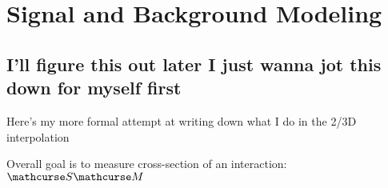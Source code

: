 \chapter{Signal and Background Modeling}


\section{I'll figure this out later I just wanna jot this down for myself first}
    Here's my more formal attempt at writing down what I do in the 2/3D interpolation

    Overall goal is to measure cross-section of an interaction: $\Xsec \matel$
